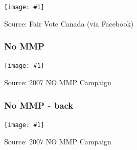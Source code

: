 \documentclass[14pt,t,hyperref={colorlinks=true,urlcolor=red}]{beamer}
\newcommand{\fullpicv}[2]
{
\begin{center}
\texttt{[image: \#1]}
\end{center}
\tiny{#2}
}
\begin{document}


\begin{frame}[plain]


\fullpicv{pix/2014-12-03-vote-fvc.png}
{ Source: Fair Vote Canada (via Facebook) }

\end{frame}


\begin{frame}
\frametitle{No MMP}

\fullpicv{pix/nommp-01.png}
{Source: 2007 NO MMP Campaign}
\end{frame}


\begin{frame}
\frametitle{No MMP - back}

\fullpicv{pix/nommp-02.png}
{Source: 2007 NO MMP Campaign}


\end{frame}
\end{document}

